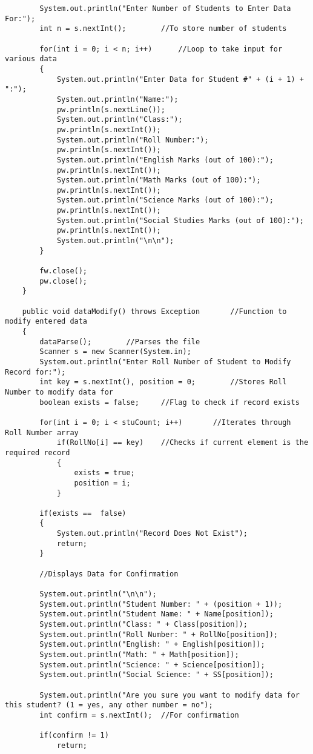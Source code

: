 \documentclass[ProgramminAssignment.tex]{subfiles}
\begin{document}
\begin{lstlisting}
		System.out.println("Enter Number of Students to Enter Data For:");
		int n = s.nextInt();		//To store number of students
		
		for(int i = 0; i < n; i++)		//Loop to take input for various data
		{
			System.out.println("Enter Data for Student #" + (i + 1) + ":");
			System.out.println("Name:");
			pw.println(s.nextLine());
			System.out.println("Class:");
			pw.println(s.nextInt());
			System.out.println("Roll Number:");
			pw.println(s.nextInt());
			System.out.println("English Marks (out of 100):");
			pw.println(s.nextInt());
			System.out.println("Math Marks (out of 100):");
			pw.println(s.nextInt());
			System.out.println("Science Marks (out of 100):");
			pw.println(s.nextInt());
			System.out.println("Social Studies Marks (out of 100):");
			pw.println(s.nextInt());
			System.out.println("\n\n");
		}
		
		fw.close();
		pw.close();
	}

	public void dataModify() throws Exception		//Function to modify entered data
	{
		dataParse();		//Parses the file
		Scanner s = new Scanner(System.in);
		System.out.println("Enter Roll Number of Student to Modify Record for:");
		int key = s.nextInt(), position = 0;		//Stores Roll Number to modify data for
		boolean exists = false;		//Flag to check if record exists
		
		for(int i = 0; i < stuCount; i++)		//Iterates through Roll Number array
			if(RollNo[i] == key)	//Checks if current element is the required record
			{
				exists = true;
				position = i;
			}
				
		if(exists ==  false)
		{
			System.out.println("Record Does Not Exist");
			return;
		}
		
		//Displays Data for Confirmation
		
		System.out.println("\n\n");
		System.out.println("Student Number: " + (position + 1));
		System.out.println("Student Name: " + Name[position]);
		System.out.println("Class: " + Class[position]);
		System.out.println("Roll Number: " + RollNo[position]);
		System.out.println("English: " + English[position]);
		System.out.println("Math: " + Math[position]);
		System.out.println("Science: " + Science[position]);
		System.out.println("Social Science: " + SS[position]);
		
		System.out.println("Are you sure you want to modify data for this student? (1 = yes, any other number = no");
		int confirm = s.nextInt();	//For confirmation
		
		if(confirm != 1)
			return;
		

\end{lstlisting}
\end{document}
